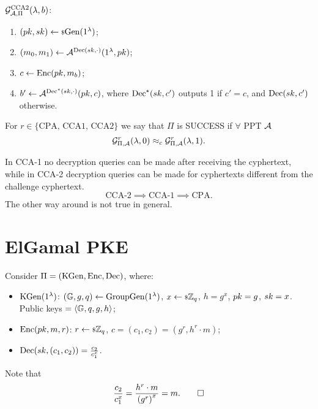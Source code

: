 \begin{definition}
	$\mathcal{G}_{\mathcal{A}, \Pi}^{\text{CCA{2}}}(\lambda, b)$:
	\begin{enumerate}
		\item $(pk, sk) \leftarrow {\scriptstyle \$} {\mathrm{Gen}(1^{\lambda})}$;
		\item $(m_0, m_1) \leftarrow \mathcal{A}^{\mathrm{Dec}(sk, \cdot)}(1^{\lambda}, pk)$;
		\item $c \leftarrow \mathrm{Enc}(pk, m_b)$;
		\item $b' \leftarrow \mathcal{A}^{\mathrm{Dec}^{\star}(sk, \cdot)}(pk, c)$, where $\mathrm{Dec}^{\star}(sk, c')$ outputs 1 if $c' = c$, and $\mathrm{Dec}(sk, c')$ otherwise. \qedhere
	\end{enumerate}
\end{definition}

For $r \in \{ \text{CPA, CCA1, CCA2} \}$ we say that $\Pi$ is SUCCESS if $\forall$ \ac{PPT} $\mathcal{A}$
\begin{equation*}
	\mathcal{G}^{r}_{\Pi, \mathcal{A}} (\lambda, 0) \approx_c \mathcal{G}^{r}_{\Pi, \mathcal{A}} (\lambda, 1).
\end{equation*}

In \ac{CCA}-1 no decryption queries can be made after receiving the cyphertext, while in \ac{CCA}-2 decryption queries can be made for cyphertexts different from the challenge cyphertext.
\begin{equation*}
	\text{CCA-2} \implies \text{CCA-1} \implies \text{CPA}.
\end{equation*}
The other way around is not true in general.

\section{ElGamal \acs{PKE}}

\begin{construction}[ElGamal] \label{cons:elgamal}
	Consider $\Pi = (\mathrm{KGen}, \mathrm{Enc}, \mathrm{Dec})$, where:
	\begin{itemize}
		\item $\mathrm{KGen}(1^{\lambda})$: $(\mathbb{G} , \allowbreak g , \allowbreak q) \leftarrow \mathrm{GroupGen}(1^{\lambda})$, $x \leftarrow {\scriptstyle \$} {\mathbb{Z}_q}$, $h = g^x$, $pk = g$, $sk = x$.
			Public keys $= \left< \mathbb{G}, q, g, h \right>$;
		\item $\mathrm{Enc}(pk, m, r)$: $r \leftarrow {\scriptstyle \$} {\mathbb{Z}_q}$, $c = (c_1, c_2) = (g^r, h^r \cdot m)$;
		\item $\mathrm{Dec}(sk, (c_1, c_2)) = \frac{c_2}{c_1^x}$.
	\end{itemize}
	Note that
	\begin{equation*}
		\frac{c_2}{c_1^x} = \frac{h^r \cdot m}{\left( g^r \right)^x} = m. \qedhere
	\end{equation*}
\end{construction}

